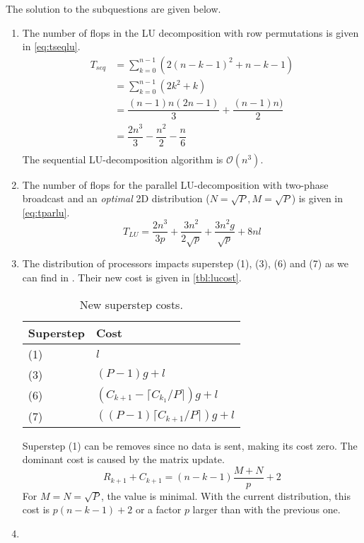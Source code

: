 \documentclass[../main.tex]{subfiles}
\begin{document}
\begin{solution} The solution to the subquestions are given below.
\begin{enumerate}
	\item The number of flops in the LU decomposition with row permutations is given in \autoref{eq:tseqlu}.
	\begin{equation}\label{eq:tseqlu}
		\begin{array}{ll}
		T_{seq} & = \displaystyle\sum_{k=0}^{n-1} (2(n - k - 1)^2 + n - k -1) \\
				& = \displaystyle\sum_{k=0}^{n-1} (2k^2 + k) \\
				& = \dfrac{(n-1)n(2n-1)}{3} + \dfrac{(n-1)n)}{2} \\
				& = \dfrac{2n^3}{3} - \dfrac{n^2}{2} - \dfrac{n}{6} \\
		\end{array}
	\end{equation}
	The sequential LU-decomposition algorithm is $\mathcal{O}(n^3)$.
	\item The number of flops for the parallel LU-decomposition with two-phase broadcast and an \emph{optimal} 2D distribution ($N = \sqrt{P}, M = \sqrt{P}$) is given in \autoref{eq:tparlu}.
	\begin{equation}\label{eq:tparlu}
			T_{LU}  = \dfrac{2n^3}{3p} + \dfrac{3n^2}{2\sqrt{p}} + \dfrac{3n^2g}{\sqrt{p}} + 8nl
	\end{equation}
\item The distribution of processors impacts superstep (1), (3), (6) and (7) as we can find in \cite[p.~70]{bisseling04}. Their new cost is given in \autoref{tbl:lucost}.
	\begin{table}[H]
	\centering
	\begin{tabular}{ll}
		\toprule
		Superstep & Cost  \\
		\midrule
		(1) & $l$ \\
		(3) & $(P-1)g+l$ \\
		(6) & $(C_{k+1} - \lceil C_{k_1}/P  \rceil )g + l$ \\
		(7) & $((P-1) \lceil C_{k+1}/P \rceil )g + l$\\
		\bottomrule
	\end{tabular}
	\caption{New superstep costs.}
	\label{tbl:lucost}
	\end{table}
	Superstep (1) can be removes since no data is sent, making its cost zero. The dominant cost is caused by the matrix update.
	\begin{equation}
		R_{k+1} + C_{k+1} = (n-k-1) \frac{M+N}{p} + 2
	\end{equation}
	For $M = N = \sqrt{P}$, the value is minimal. With the current distribution, this cost is $p (n-k-1) + 2$ or a factor $p$ larger than with the previous one.
\item
\end{enumerate}
\end{solution}
\end{document}
